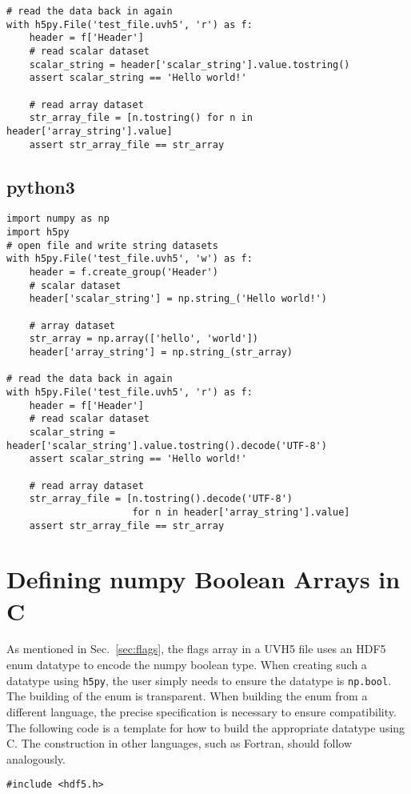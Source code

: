 \documentclass[11pt, oneside]{article}
\begin{document}
\begin{appendices}
\begin{verbatim}
# read the data back in again
with h5py.File('test_file.uvh5', 'r') as f:
    header = f['Header']
    # read scalar dataset
    scalar_string = header['scalar_string'].value.tostring()
    assert scalar_string == 'Hello world!'

    # read array dataset
    str_array_file = [n.tostring() for n in header['array_string'].value]
    assert str_array_file == str_array
\end{verbatim}

\subsection{python3}
\begin{verbatim}
import numpy as np
import h5py
# open file and write string datasets
with h5py.File('test_file.uvh5', 'w') as f:
    header = f.create_group('Header')
    # scalar dataset
    header['scalar_string'] = np.string_('Hello world!')

    # array dataset
    str_array = np.array(['hello', 'world'])
    header['array_string'] = np.string_(str_array)

# read the data back in again
with h5py.File('test_file.uvh5', 'r') as f:
    header = f['Header']
    # read scalar dataset
    scalar_string = header['scalar_string'].value.tostring().decode('UTF-8')
    assert scalar_string == 'Hello world!'

    # read array dataset
    str_array_file = [n.tostring().decode('UTF-8')
                      for n in header['array_string'].value]
    assert str_array_file == str_array
\end{verbatim}


\section{Defining numpy Boolean Arrays in C}
\label{appendix:boolean}
As mentioned in Sec.~\ref{sec:flags}, the flags array in a UVH5 file uses an
HDF5 enum datatype to encode the numpy boolean type. When creating such a
datatype using \verb+h5py+, the user simply needs to ensure the datatype is
\verb+np.bool+. The building of the enum is transparent. When building the enum
from a different language, the precise specification is necessary to ensure
compatibility. The following code is a template for how to build the appropriate
datatype using C. The construction in other languages, such as Fortran, should
follow analogously.
\begin{verbatim}
#include <hdf5.h>


\end{verbatim}
\end{appendices}
\end{document}
